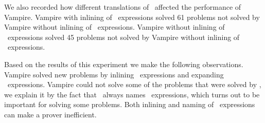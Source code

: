 We also recorded how different translations of \LETIN\ affected the performance of Vampire. Vampire with inlining of \LETIN\ expressions solved 61 problems not solved by Vampire without inlining of \LETIN\ expressions. Vampire without inlining of \LETIN\ expressions solved 45 problems not solved by Vampire without inlining of \LETIN\ expressions.

Based on the results of this experiment we make the following observations. Vampire solved new problems by inlining \LETIN\ expressions and expanding \ITE\ expressions. Vampire could not solve some of the problems that were solved by \oldcnfVampire, we explain it by the fact that \oldcnfVampire\ always names \ITE\ expressions, which turns out to be important for solving some problems. Both inlining and naming of \LETIN\ expressions can make a prover inefficient.
